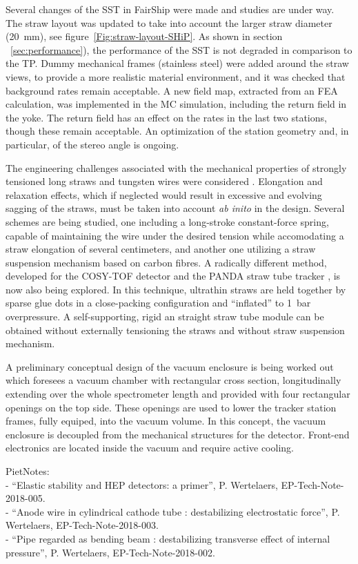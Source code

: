 Several changes of the SST in FairShip were made and studies are under way.
The straw layout was updated to take into account the larger straw diameter (20~mm), 
see figure~\ref{Fig:straw-layout-SHiP}.
As shown in  section ~\ref{sec:performance}),  the performance of the SST is not degraded 
in comparison to the TP.
Dummy mechanical frames (stainless steel) were added around the straw views, to provide a more realistic
material environment, and it was checked that background rates remain acceptable. 
A new field map, extracted from an FEA calculation, was implemented in the MC simulation, 
including the return field in the yoke. The return field has an effect on the rates
in the last two stations, though these remain acceptable.
An optimization of the station geometry and, in particular, of the stereo angle is ongoing.

The engineering challenges associated with the mechanical properties of strongly tensioned 
long straws and tungsten wires were considered \cite{PietNotes}.
Elongation and relaxation effects, which if neglected would result in excessive
and evolving sagging of the straws, must be taken into account {\sl ab inito} in the design.
Several schemes are being studied, one including a long-stroke constant-force spring,
capable of maintaining the wire under the desired tension while
accomodating a straw elongation of several centimeters, 
and another one utilizing a straw suspension mechanism based on carbon fibres.
A radically different method, developed for the COSY-TOF detector and the PANDA straw  tube 
tracker \cite{PANDA_TDR}, is now also being explored. In this technique, ultrathin straws are held 
together by sparse glue dots in a close-packing configuration and ``inflated'' to 1~bar overpressure.
A self-supporting, rigid an straight straw tube module
can be obtained without externally tensioning the straws and without straw suspension mechanism.

A preliminary conceptual design of the vacuum enclosure is being worked out
which foresees a vacuum chamber with rectangular cross section, longitudinally extending 
over the whole spectrometer length and provided with four rectangular openings on the top side.
These openings are used to lower the tracker station frames, fully equiped, into the vacuum volume.
In this concept, the vacuum enclosure is decoupled from the mechanical structures
for the detector. 
Front-end electronics are located inside the vacuum and require active cooling.

PietNotes:\\
- ``Elastic stability and HEP detectors: a primer'', P. Wertelaers, EP-Tech-Note-2018-005.\\
- ``Anode wire in cylindrical cathode tube : destabilizing electrostatic force'', P. Wertelaers, EP-Tech-Note-2018-003.\\
- ``Pipe regarded as bending beam : destabilizing transverse effect of internal pressure'', P. Wertelaers, EP-Tech-Note-2018-002. 

